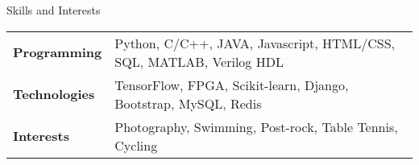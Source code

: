\documentclass{resume_ucla} %
\begin{document}
\begin{rSection}{Skills and Interests}
\begin{tabular}{ll}
\textbf{Programming} & Python, C/C++, JAVA, Javascript, HTML/CSS, SQL, MATLAB, Verilog HDL\\
\textbf{Technologies} & TensorFlow, FPGA, Scikit-learn, Django, Bootstrap, MySQL, Redis\\
\textbf{Interests} & Photography, Swimming, Post-rock, Table Tennis, Cycling\\
\end{tabular}
\end{rSection}




\end{document}
